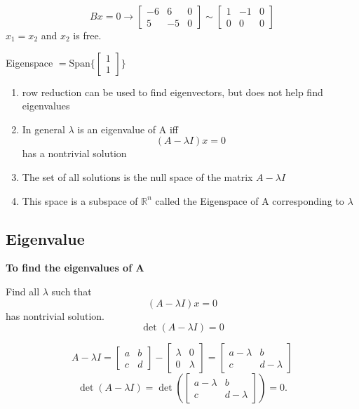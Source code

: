 \begin{equation}
	\label{}
Bx=0\to
\begin{bmatrix}
	-6&6&0\\5&-5&0	
\end{bmatrix}
\sim
\begin{bmatrix}
	1&-1&0\\0&0&0	
\end{bmatrix}
\end{equation}
$x_{1}=x_{2}$ and $x_{2}$ is free.

Eigenspace $= \mbox{Span}\{
	\begin{bmatrix}
	1\\1	
\end{bmatrix}\}
$


\begin{enumerate}
	\item row reduction can be used to find eigenvectors, but does not help find eigenvalues 
	\item In general $\lambda$ is an eigenvalue of A iff
		\begin{equation}
			(A-\lambda I)x=0	
		\end{equation}
		has a nontrivial solution
	\item The set of all solutions is the null space of the matrix $A-\lambda I$
	\item This space is a subspace of $\mathbb{R}^{n}$ called the Eigenspace of A corresponding to $\lambda$
\end{enumerate}


\subsection{Eigenvalue}

\textbf{To find the eigenvalues of A}

Find all $\lambda$ such that 
\begin{equation}
	\label{}
	(A-\lambda I)x=0
\end{equation}
has nontrivial solution.
\begin{equation}
	\label{}
\det(A-\lambda I)=0	
\end{equation}

\begin{equation}
	\label{}
A-\lambda I = 
\begin{bmatrix}
	a&b\\c&d	
\end{bmatrix}-
\begin{bmatrix}
	\lambda & 0\\0&\lambda	
\end{bmatrix}=
\begin{bmatrix}
	a-\lambda & b\\c&d-\lambda	
\end{bmatrix}
\end{equation}
\begin{equation}
	\label{}
\det(A-\lambda I) = \det(
\begin{bmatrix}
	a-\lambda & b\\c&d-\lambda	
\end{bmatrix})=0.
\end{equation}



